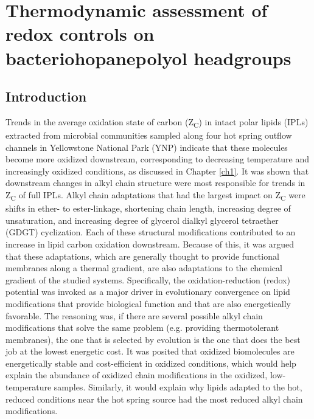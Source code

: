 \chapter{Thermodynamic assessment of redox controls on bacteriohopanepolyol headgroups}\label{ch3}


\section{Introduction}

Trends in the average oxidation state of carbon (Z\textsubscript{C}) in intact polar lipids (IPLs) extracted from microbial communities sampled along four hot spring outflow channels in Yellowstone National Park (YNP) indicate that these molecules become more oxidized downstream, corresponding to decreasing temperature and increasingly oxidized conditions, as discussed in Chapter \ref{ch1}. It was shown that downstream changes in alkyl chain structure were most responsible for trends in Z\textsubscript{C} of full IPLs. Alkyl chain adaptations that had the largest impact on Z\textsubscript{C} were shifts in ether- to ester-linkage, shortening chain length, increasing degree of unsaturation, and increasing degree of glycerol dialkyl glycerol tetraether (GDGT) cyclization. Each of these structural modifications contributed to an increase in lipid carbon oxidation downstream. Because of this, it was argued that these adaptations, which are generally thought to provide functional membranes along a thermal gradient, are also adaptations to the chemical gradient of the studied systems. Specifically, the oxidation-reduction (redox) potential was invoked as a major driver in evolutionary convergence on lipid modifications that provide biological function and that are also energetically favorable. The reasoning was, if there are several possible alkyl chain modifications that solve the same problem (e.g. providing thermotolerant membranes), the one that is selected by evolution is the one that does the best job at the lowest energetic cost. It was posited that oxidized biomolecules are energetically stable and cost-efficient in oxidized conditions, which would help explain the abundance of oxidized chain modifications in the oxidized, low-temperature samples. Similarly, it would explain why lipids adapted to the hot, reduced conditions near the hot spring source had the most reduced alkyl chain modifications.

